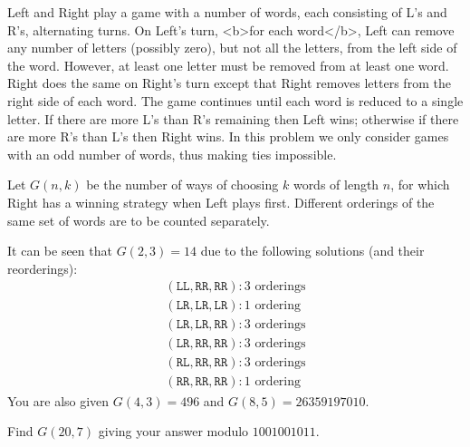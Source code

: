 Left and Right play a game with a number of words, each consisting of L's and R's, alternating turns. On Left's turn, <b>for each word</b>, Left can remove any number of letters (possibly zero), but not all the letters, from the left side of the word. However, at least one letter must be removed from at least one word. Right does the same on Right's turn except that Right removes letters from the right side of each word. The game continues until each word is reduced to a single letter. If there are more L's than R's remaining then Left wins; otherwise if there are more R's than L's then Right wins. In this problem we only consider games with an odd number of words, thus making ties impossible.

Let $G(n, k)$ be the number of ways of choosing $k$ words of length $n$, for which Right has a winning strategy when Left plays first. Different orderings of the same set of words are to be counted separately.

It can be seen that $G(2, 3)=14$ due to the following solutions (and their reorderings):
$$\begin{align*}
(\texttt{LL},\texttt{RR},\texttt{RR}):3\text{ orderings}\\
(\texttt{LR},\texttt{LR},\texttt{LR}):1\text{ ordering}\\
(\texttt{LR},\texttt{LR},\texttt{RR}):3\text{ orderings}\\
(\texttt{LR},\texttt{RR},\texttt{RR}):3\text{ orderings}\\
(\texttt{RL},\texttt{RR},\texttt{RR}):3\text{ orderings}\\
(\texttt{RR},\texttt{RR},\texttt{RR}):1\text{ ordering}
\end{align*}
$$You are also given $G(4, 3)=496$ and $G(8, 5)=26359197010$.

Find $G(20, 7)$ giving your answer modulo $1001001011$.
